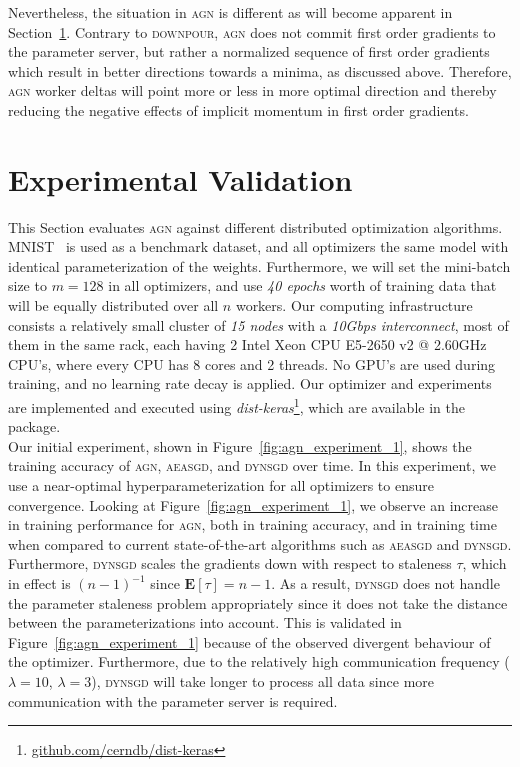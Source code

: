 \documentclass[wcp]{jmlr}
\begin{document}
Nevertheless, the situation in \textsc{agn} is different as will become apparent in Section~\ref{sec:experiments}. Contrary to \textsc{downpour}, \textsc{agn} does not commit first order gradients to the parameter server, but rather a normalized sequence of first order gradients which result in better directions towards a minima, as discussed above. Therefore, \textsc{agn} worker deltas will point more or less in more optimal direction and thereby reducing the negative effects of implicit momentum in first order gradients.

\section{Experimental Validation}
\label{sec:experiments}

This Section evaluates \textsc{agn} against different distributed optimization algorithms. MNIST~\cite{mnist} is used as a benchmark dataset, and all optimizers the same model with identical parameterization of the weights. Furthermore, we will set the mini-batch size to $m = 128$ in all optimizers, and use \emph{40 epochs} worth of training data that will be equally distributed over all $n$ workers. Our computing infrastructure consists a relatively small cluster of \emph{15 nodes} with a \emph{10Gbps interconnect}, most of them in the same rack, each having 2 Intel\textsuperscript{\textregistered} Xeon\textsuperscript{\textregistered} CPU E5-2650 v2 @ 2.60GHz CPU's, where every CPU has 8 cores and 2 threads. No GPU's are used during training, and no learning rate decay is applied. Our optimizer and experiments are implemented and executed using \emph{dist-keras}\footnote{\url{github.com/cerndb/dist-keras}}, which are available in the package.\\

Our initial experiment, shown in Figure~\ref{fig:agn_experiment_1}, shows the training accuracy of \textsc{agn}, \textsc{aeasgd}, and \textsc{dynsgd} over time. In this experiment, we use a near-optimal hyperparameterization for all optimizers to ensure convergence. Looking at Figure~\ref{fig:agn_experiment_1}, we observe an increase in training performance for \textsc{agn}, both in training accuracy, and in training time when compared to current state-of-the-art algorithms such as \textsc{aeasgd} and \textsc{dynsgd}. Furthermore, \textsc{dynsgd} scales the gradients down with respect to staleness $\tau$, which in effect is $(n - 1)^{-1}$ since $\textbf{E}[\tau] = n - 1$. As a result, \textsc{dynsgd} does not handle the parameter staleness problem appropriately since it does not take the distance between the parameterizations into account. This is validated in Figure~\ref{fig:agn_experiment_1} because of the observed divergent behaviour of the optimizer. Furthermore, due to the relatively high communication frequency ($\lambda = 10$, $\lambda = 3$), \textsc{dynsgd} will take longer to process all data since more communication with the parameter server is required.\\
\end{document}
